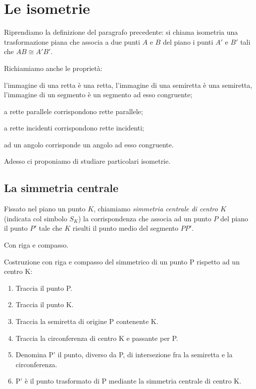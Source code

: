 \section{Le isometrie}
\label{sect:isometrie}

Riprendiamo la definizione del paragrafo precedente: si chiama 
isometria una trasformazione piana che associa a due punti \(A\) e \(B\) 
del piano i punti \(A'\) e \(B'\) tali che \(AB\cong A'B'\).

Richiamiamo anche le proprietà:
\begin{itemize*}
\item l'immagine di una retta è una retta, l'immagine di una 
semiretta è una semiretta, l'immagine di un segmento è un segmento ad 
esso congruente;
\item a rette parallele corrispondono rette parallele;
\item a rette incidenti corrispondono rette incidenti;
\item ad un angolo corrisponde un angolo ad esso congruente.
\end{itemize*}

Adesso ci proponiamo di studiare particolari isometrie.


\subsection{La simmetria centrale}

\begin{definizione}
Fissato nel piano un punto \(K\), chiamiamo \emph{simmetria centrale di 
centro \(K\)} (indicata col simbolo \(S_K\)) la  corrispondenza che 
associa ad un punto \(P\) del piano il punto \(P'\) tale che \(K\) risulti 
il punto medio del segmento \(PP'\).
\end{definizione}

Con riga e compasso.

\begin{procedura}
  Costruzione con riga e compasso del simmetrico di un punto P rispetto ad un 
centro K:
  \begin{enumerate} [nosep]
    \item 
    Traccia il punto P.
    \item 
    Traccia il punto K.
    \item 
    Traccia la semiretta di origine P contenente K.
    \item 
    Traccia la circonferenza di centro K e passante per P. 
    \item 
    Denomina P' il punto, diverso da P, di intersezione fra la semiretta e la 
circonferenza.  
    \item 
    P' è il punto trasformato di P mediante la simmetria centrale di centro K.
  \end{enumerate}
\end{procedura}

